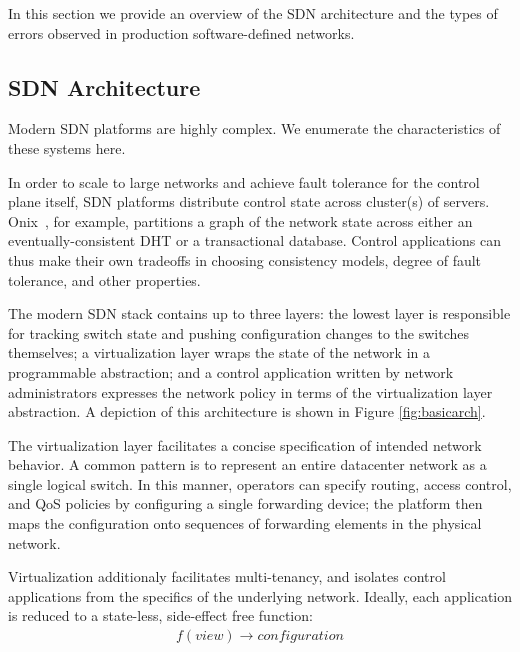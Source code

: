 In this section we provide an overview of the SDN architecture and the types
of errors observed in production software-defined networks.

\subsection{SDN Architecture}

Modern SDN platforms are highly complex. We enumerate the characteristics of
these systems here.

In order to scale to large networks and achieve fault tolerance for the control
plane itself, SDN platforms distribute control state across cluster(s) of servers.
Onix~\cite{onix}, for example,
partitions a graph of the network state across either an eventually-consistent
DHT or a transactional database. Control applications can thus make their own
tradeoffs in choosing consistency models, degree of
fault tolerance, and other properties.

The modern SDN stack 
contains up to three layers: the lowest
layer is responsible for tracking switch state and pushing configuration
changes to the switches themselves; a virtualization layer
wraps the state of the network in a programmable abstraction; and a control
application written by network administrators 
expresses the network policy in terms of the virtualization layer abstraction.
A depiction of this architecture is shown in Figure \ref{fig:basicarch}.

The virtualization layer facilitates a concise specification of
intended network behavior. A common pattern is to represent an entire
datacenter network as a single logical switch. In this manner, operators
can specify routing, access control, and QoS policies by configuring a single forwarding
device; the platform then maps the configuration onto sequences 
of forwarding elements in the physical network.

Virtualization additionaly facilitates multi-tenancy, and isolates control applications from the specifics
of the underlying network. Ideally, each application is reduced to a
state-less, side-effect free function:
\begin{align*}
f(view) \rightarrow configuration
\end{align*}

